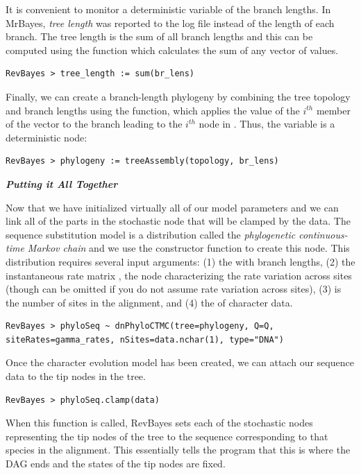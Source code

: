 It is convenient to monitor a deterministic variable of the branch lengths. In MrBayes, \textit{tree length} was reported to the log file instead of the length of each branch. The tree length is the sum of all branch lengths and this can be computed using the  function which calculates the sum of any vector of values.
{\tt \begin{snugshade*}
\begin{lstlisting}
RevBayes > tree_length := sum(br_lens)
\end{lstlisting}
\end{snugshade*}}

Finally, we can create a branch-length phylogeny by combining the tree topology and branch lengths using the  function, which applies the value of the $i^{th}$ member of the  vector to the branch leading to the $i^{th}$ node in . Thus, the  variable is a deterministic node: 

{\tt \begin{snugshade*}
\begin{lstlisting}
RevBayes > phylogeny := treeAssembly(topology, br_lens)
\end{lstlisting}
\end{snugshade*}}



\textbf{\textit{Putting it All Together}}

Now that we have initialized virtually all of our model parameters and we can link all of the parts in the stochastic node that will be clamped by the data. 
The sequence substitution model is a distribution called the \textit{phylogenetic continuous-time Markov chain} and we use the  constructor function to create this node.
This distribution requires several input arguments: (1) the  with branch lengths, (2) the instantaneous rate matrix , the node characterizing the rate variation across sites (though  can be omitted if you do not assume rate variation across sites), (3)  is the number of sites in the alignment, and (4) the  of character data.
{\tt \begin{snugshade*}
\begin{lstlisting}
RevBayes > phyloSeq ~ dnPhyloCTMC(tree=phylogeny, Q=Q, siteRates=gamma_rates, nSites=data.nchar(1), type="DNA")
\end{lstlisting}
\end{snugshade*}}


Once the character evolution model has been created, we can attach our sequence data to the tip nodes in the tree.
{\tt \begin{snugshade*}
\begin{lstlisting}
RevBayes > phyloSeq.clamp(data)
\end{lstlisting}
\end{snugshade*}}
When this function is called, RevBayes sets each of the stochastic nodes representing the tip nodes of the tree to the sequence corresponding to that species in the alignment. 
This essentially tells the program that this is where the DAG ends and the states of the tip nodes are fixed. 

